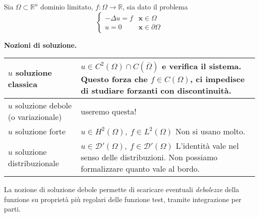 \documentclass[10pt,a4paper,twoside,openright]{book}
\begin{document}
Sia $\displaystyle \Omega \subset \mathbb{R}^{n}$ dominio limitato, $\displaystyle f:\Omega \rightarrow \mathbb{R}$, sia dato il problema
\begin{equation}
	\begin{cases}
		-\Delta u=f & \mathbf{x} \in \Omega          \\
		u=0         & \mathbf{x} \in \partial \Omega 
	\end{cases}
	\label{eq:af-problema-poisson}
\end{equation}
\vspace*{0.5cm}
\begin{center}
	\textbf{Nozioni di soluzione.}
\end{center}
\begin{center}
	{\renewcommand{\arraystretch}{2.8}%
	\begin{tabular}{|l|l|}
		\hline 
		$u$ soluzione classica                               & \makecell[l]{$\displaystyle u\in C^{2}( \Omega ) \cap C(\overline{\Omega })$ e verifica il sistema. \\Questo forza che $\displaystyle f\in C( \Omega )$, ci impedisce di studiare\\forzanti con discontinuità.} \\
		\hline 
		\makecell[l]{$u$ soluzione debole\\(o variazionale)} & useremo questa! \\
		\hline 
		$u$ soluzione forte                                  & \makecell[l]{$\displaystyle u\in H^{2}( \Omega ) ,\ f\in L^{2}( \Omega )$                           \\Non si usano molto.} \\
		\hline 
		$u$ soluzione distribuzionale                        & \makecell[l]{$\displaystyle u\in \mathcal{D} '( \Omega ) ,\ f\in \mathcal{D} '( \Omega )$           \\L'identità vale nel senso delle distribuzioni.\\Non possiamo formalizzare quanto vale al bordo.} \\
		\hline
	\end{tabular}
	}
\end{center}
\vspace*{0.5cm}
La nozione di soluzione debole permette di scaricare eventuali \textit{debolezze} della funzione su proprietà più regolari delle funzione test, tramite integrazione per parti. 
\end{document}
